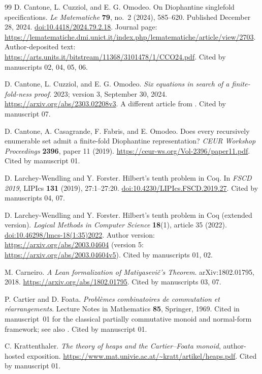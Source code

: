 \documentclass[11pt,a4paper]{article}
\theoremstyle{definition}
\theoremstyle{remark}
\begin{document}
\begin{thebibliography}{99}
D. Cantone, L. Cuzziol, and E. G. Omodeo.
On Diophantine singlefold specifications.
\emph{Le Matematiche} \textbf{79}, no.~2 (2024), 585--620. Published December 28, 2024.
\href{https://doi.org/10.4418/2024.79.2.18}{doi:10.4418/2024.79.2.18}.
Journal page: \url{https://lematematiche.dmi.unict.it/index.php/lematematiche/article/view/2703}.
Author-deposited text: \url{https://arts.units.it/bitstream/11368/3101478/1/CCO24.pdf}.
Cited by manuscripts 02, 04, 05, 06.

D. Cantone, L. Cuzziol, and E. G. Omodeo.
\emph{Six equations in search of a finite-fold-ness proof}.
2023; version 3, September 30, 2024.
\url{https://arxiv.org/abs/2303.02208v3}.
A different article from \cite{cco2024}.
Cited by manuscript 07.

D. Cantone, A. Casagrande, F. Fabris, and E. Omodeo.
Does every recursively enumerable set admit a finite-fold Diophantine representation?
\emph{CEUR Workshop Proceedings} \textbf{2396}, paper 11 (2019).
\url{https://ceur-ws.org/Vol-2396/paper11.pdf}.
Cited by manuscript 01.

D. Larchey-Wendling and Y. Forster.
Hilbert's tenth problem in Coq.
In \emph{FSCD 2019}, LIPIcs \textbf{131} (2019), 27:1--27:20.
\href{https://doi.org/10.4230/LIPIcs.FSCD.2019.27}{doi:10.4230/LIPIcs.FSCD.2019.27}.
Cited by manuscripts 04, 07.

D. Larchey-Wendling and Y. Forster.
Hilbert's tenth problem in Coq (extended version).
\emph{Logical Methods in Computer Science} \textbf{18}(1), article 35 (2022).
\href{https://doi.org/10.46298/lmcs-18(1:35)2022}{doi:10.46298/lmcs-18(1:35)2022}.
Author version: \url{https://arxiv.org/abs/2003.04604} (version 5: \url{https://arxiv.org/abs/2003.04604v5}).
Cited by manuscripts 01, 02.

M. Carneiro.
\emph{A Lean formalization of Matiyasevi\v{c}'s Theorem}.
arXiv:1802.01795, 2018.
\url{https://arxiv.org/abs/1802.01795}.
Cited by manuscripts 03, 07.

P. Cartier and D. Foata.
\emph{Probl\`emes combinatoires de commutation et r\'earrangements}.
Lecture Notes in Mathematics \textbf{85}, Springer, 1969.
Cited in manuscript~01 for the classical partially commutative monoid and normal-form framework; see also \cite{krattenthaler}.
Cited by manuscript 01.

C. Krattenthaler.
\emph{The theory of heaps and the Cartier--Foata monoid}, author-hosted exposition.
\url{https://www.mat.univie.ac.at/~kratt/artikel/heaps.pdf}.
Cited by manuscript 01.


\end{thebibliography}
\end{document}
